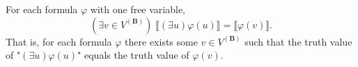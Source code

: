 For each formula $\varphi$ with one free variable,
$$(\exists v \in V^{(\mathbf{B})})\; \llbracket (\exists u) \varphi(u) \rrbracket = \llbracket \varphi(v) \rrbracket.$$
That is, for each formula $\varphi$ there exists some $v \in V^{(\mathbf{B})}$ such that the truth value of "$(\exists u)\varphi(u)$" equals the truth value of $\varphi(v)$.
